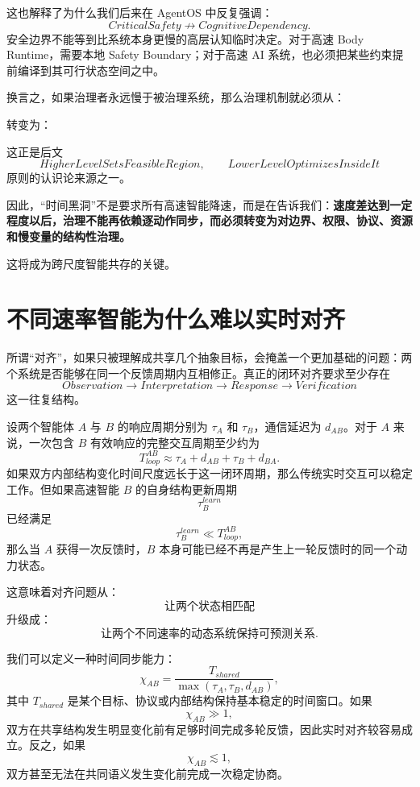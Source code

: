 这也解释了为什么我们后来在 AgentOS 中反复强调：
\[
CriticalSafety\nrightarrow CognitiveDependency.
\]
安全边界不能等到比系统本身更慢的高层认知临时决定。对于高速 Body Runtime，需要本地 Safety Boundary；对于高速 AI 系统，也必须把某些约束提前编译到其可行状态空间之中。

换言之，如果治理者永远慢于被治理系统，那么治理机制就必须从：
\begin{statementbox}
\centering
{}
\end{statementbox}
转变为：
\begin{statementbox}
\centering
{}
\end{statementbox}

这正是后文
\[
HigherLevelSetsFeasibleRegion,\qquad
LowerLevelOptimizesInsideIt
\]
原则的认识论来源之一。

因此，“时间黑洞”不是要求所有高速智能降速，而是在告诉我们：\textbf{速度差达到一定程度以后，治理不能再依赖逐动作同步，而必须转变为对边界、权限、协议、资源和慢变量的结构性治理。}

这将成为跨尺度智能共存的关键。


\section{不同速率智能为什么难以实时对齐}

所谓“对齐”，如果只被理解成共享几个抽象目标，会掩盖一个更加基础的问题：两个系统是否能够在同一个反馈周期内互相修正。真正的闭环对齐要求至少存在
\[
Observation
\rightarrow
Interpretation
\rightarrow
Response
\rightarrow
Verification
\]
这一往复结构。

设两个智能体 $A$ 与 $B$ 的响应周期分别为 $\tau_A$ 和 $\tau_B$，通信延迟为 $d_{AB}$。对于 $A$ 来说，一次包含 $B$ 有效响应的完整交互周期至少约为
\[
T_{loop}^{AB}
\approx
\tau_A+d_{AB}+\tau_B+d_{BA}.
\]
如果双方内部结构变化时间尺度远长于这一闭环周期，那么传统实时交互可以稳定工作。但如果高速智能 $B$ 的自身结构更新周期
\[
\tau_B^{learn}
\]
已经满足
\[
\tau_B^{learn}
\ll
T_{loop}^{AB},
\]
那么当 $A$ 获得一次反馈时，$B$ 本身可能已经不再是产生上一轮反馈时的同一个动力状态。

这意味着对齐问题从：
\[
\text{让两个状态相匹配}
\]
升级成：
\[
\text{让两个不同速率的动态系统保持可预测关系}.
\]

我们可以定义一种时间同步能力：
\[
\chi_{AB}
=
\frac{
T_{shared}
}{
\max(\tau_A,\tau_B,d_{AB})
},
\]
其中 $T_{shared}$ 是某个目标、协议或内部结构保持基本稳定的时间窗口。如果
\[
\chi_{AB}\gg1,
\]
双方在共享结构发生明显变化前有足够时间完成多轮反馈，因此实时对齐较容易成立。反之，如果
\[
\chi_{AB}\lesssim1,
\]
双方甚至无法在共同语义发生变化前完成一次稳定协商。

